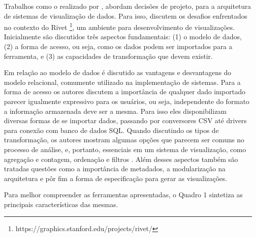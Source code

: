 Trabalhos como o realizado por , abordam decisões de projeto, para a 
arquitetura de sistemas de visualização de dados. Para isso,  discutem 
os desafios enfrentados no contexto do Rivet 
\footnote{https://graphics.stanford.edu/projects/rivet/}, um ambiente para desenvolvimento de 
visualizações. Inicialmente são discutidos três aspectos fundamentais: (1) o modelo de dados, 
(2) a forma de acesso, ou seja, como os dados podem ser importados para a ferramenta, e (3) 
as capacidades de transformação que devem existir. 

Em relação ao modelo de dados é discutido as vantagens e desvantagens do modelo relacional, 
comumente utilizado na implementação de sistemas. Para a forma de acesso os autores discutem 
a importância de qualquer dado importado parecer igualmente expressivo para os usuários, ou 
seja, independente do formato a informação armazenada deve ser a mesma. Para isso eles 
disponibilizam diversas formas de se importar dados, passando por conversores CSV até 
drivers para conexão com banco de dados SQL. Quando discutindo os tipos de transformação, 
os autores mostram algumas opções que parecem ser comuns no processo de análise, e, 
portanto, essenciais em um sistema de visualização, como agregação e contagem, ordenação e 
filtros \cite{tang2004}. Além desses aspectos também são tratadas questões como a 
importância de metadados, a modularização na arquitetura e pôr fim a forma de especificação 
para gerar as visualizações.

Para melhor compreender as ferramentas apresentadas, o Quadro 1 sintetiza as principais 
características das mesmas.

